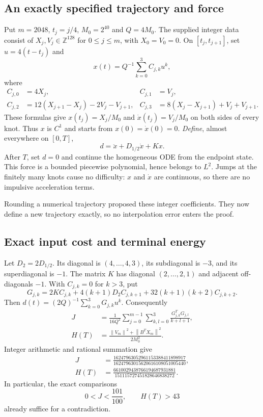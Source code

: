 \documentclass[11pt,letterpaper]{article}
\newcommand{\norm}[1]{\left\lVert#1\right\rVert}
\begin{document}
\subsection*{An exactly specified trajectory and force}
Put $m=2048$, $t_j=j/4$, $M_0=2^{40}$ and $Q=4M_0$.
The supplied integer data consist of
$X_j,V_j\in\mathbb Z^{128}$ for $0\leq j\leq m$, with
$X_0=V_0=0$. On $[t_j,t_{j+1}]$, set $u=4(t-t_j)$ and
\begin{equation}\label{eq:hermite}
 x(t)=Q^{-1}\sum_{k=0}^3 C_{j,k}u^k,
\end{equation}
where
\begin{align*}
 C_{j,0}&=4X_j,&C_{j,1}&=V_j,\\
 C_{j,2}&=12(X_{j+1}-X_j)-2V_j-V_{j+1},&
 C_{j,3}&=8(X_j-X_{j+1})+V_j+V_{j+1}.
\end{align*}
These formulas give $x(t_j)=X_j/M_0$ and $\dot x(t_j)=V_j/M_0$ on both sides
of every knot. Thus $x$ is $C^1$ and starts from $x(0)=\dot x(0)=0$.
\emph{Define}, almost everywhere on $[0,T]$,
\begin{equation}\label{eq:exact-force}
 d=\ddot x+D_{1/2}\dot x+Kx.
\end{equation}
After $T$, set $d=0$ and continue the homogeneous ODE from the endpoint state.
This force is a bounded piecewise polynomial, hence belongs to $L^2$.
Jumps at the finitely many knots cause no difficulty: $x$ and $\dot x$ are
continuous, so there are no impulsive acceleration terms.

Rounding a numerical trajectory proposed these integer coefficients. They now
define a new trajectory exactly, so no interpolation error enters the proof.

\subsection*{Exact input cost and terminal energy}
Let $D_2=2D_{1/2}$. Its diagonal is $(4,\ldots,4,3)$, its subdiagonal is $-3$,
and its superdiagonal is $-1$. The matrix $K$ has diagonal $(2,\ldots,2,1)$
and adjacent off-diagonals $-1$. With $C_{j,k}=0$ for $k>3$, put
\[
 G_{j,k}=2KC_{j,k}+4(k+1)D_2C_{j,k+1}
             +32(k+1)(k+2)C_{j,k+2}.
\]
Then $d(t)=(2Q)^{-1}\sum_{k=0}^3G_{j,k}u^k$. Consequently
\begin{align}
 J&=\frac1{16Q^2}\sum_{j=0}^{m-1}\sum_{k,l=0}^3
            \frac{G_{j,k}^TG_{j,l}}{k+l+1},\label{eq:J-exact}\\
 H(T)&=\frac{\norm{V_m}^2+\norm{B^TX_m}^2}{2M_0^2}.\label{eq:H-exact}
\end{align}
Integer arithmetic and rational summation give
\begin{align*}
 J&=\frac{16247963052961153388411898917}
          {16247963015620616108051005440},\\
 H(T)&=\frac{6610029438766194687931881}
            {151115727451828646838272}.
\end{align*}
In particular, the exact comparisons
\begin{equation}\label{eq:simpleHJ}
 0<J<\frac{101}{100},\qquad H(T)>43
\end{equation}
already suffice for a contradiction.
\end{document}
